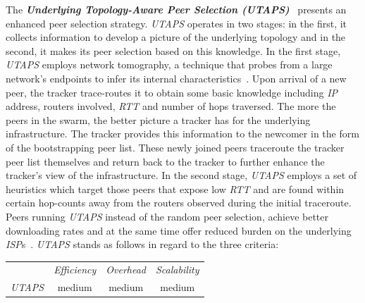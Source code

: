 The \textbf{\emph{Underlying Topology-Aware Peer Selection (UTAPS)}}~\cite{LCY2008}
presents an enhanced peer selection strategy. 
\emph{UTAPS} operates in two stages: in the first,
it collects information to develop a picture of the underlying topology 
and in the second, it makes its peer selection based on 
this knowledge. In the first stage, \emph{UTAPS} employs
network tomography, a technique that probes from a large network's 
endpoints to infer its internal characteristics~\cite{chny_tomography_2002}. 
Upon arrival of a new peer, the tracker trace-routes 
it to obtain some basic knowledge 
including \emph{IP} address, routers involved, \emph{RTT} and number of 
hops traversed.
The more the peers in the swarm, the better 
picture a tracker has for the underlying infrastructure.  
The tracker provides this information to the newcomer in the form
of the bootstrapping peer list. 
These newly joined peers traceroute the tracker
peer list themselves and return back to the tracker to further enhance
the tracker's view of the infrastructure.
In the second stage, \emph{UTAPS} employs a set of heuristics
which target those peers that expose low \emph{RTT} and are found within
certain hop-counts away from
the routers observed during the initial traceroute.
Peers running \emph{UTAPS}
instead of the random peer selection, achieve better downloading rates
and at the same time offer reduced burden on the underlying \emph{ISP}s~\cite{LCY2008}. 
\emph{UTAPS} stands as follows in regard to the three criteria:
\begin{center}
{\footnotesize
\begin{tabular}{rccc}
\multicolumn{1}{r}{} &
\multicolumn{1}{c}{\emph{Efficiency}} &
\multicolumn{1}{c}{\emph{Overhead}} &
\multicolumn{1}{c}{\emph{Scalability}}
\\
\cline{2-4}
\emph{UTAPS} &
medium &
medium &
%
medium
\end{tabular}
}
\end{center}

